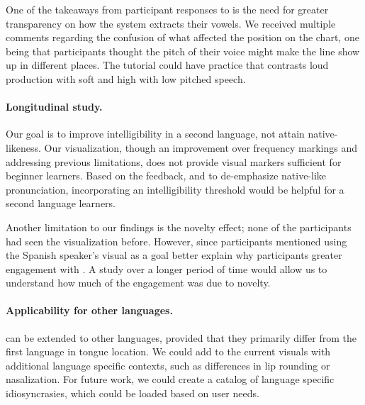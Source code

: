 
One of the takeaways from participant responses to \visowel{} is the need for greater transparency on how the system extracts their vowels. We received multiple comments regarding the confusion of what affected the position on the chart, one being that participants thought the pitch of their voice might make the line show up in different places. The tutorial could have practice that contrasts loud production with soft and high with low pitched speech.


\paragraph{Longitudinal study.}
Our goal is to improve intelligibility in a second language, not attain native-likeness. Our visualization, though an improvement over frequency markings and addressing previous limitations, does not provide visual markers sufficient for beginner learners. Based on the feedback, and to de-emphasize native-like pronunciation, incorporating an intelligibility threshold would be helpful for a second language learners. 

Another limitation to our findings is the novelty effect; none of the participants had seen the visualization before. However, since participants mentioned using the Spanish speaker's visual as a goal better explain why participants greater engagement with \visowel{}. A study over a longer period of time would allow us to understand how much of the engagement was due to novelty.

\paragraph{Applicability for other languages.}
\visowel{} can be extended to other languages, provided that they primarily differ from the first language in tongue location. We could add to the current visuals with additional language specific contexts, such as differences in lip rounding or nasalization. For future work, we could create a catalog of language specific idiosyncrasies, which could be loaded based on user needs.